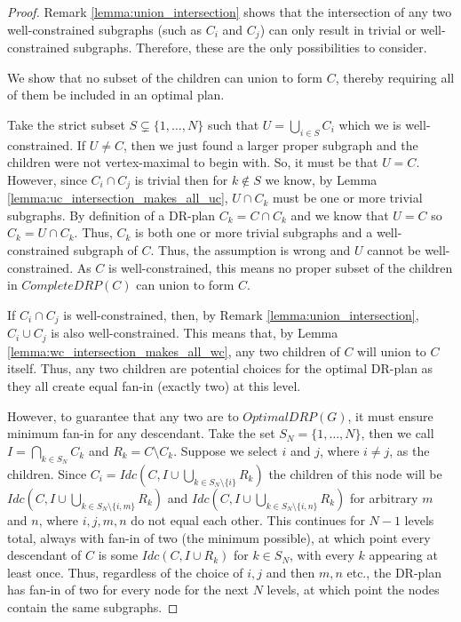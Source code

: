 \begin{proof}
Remark \ref{lemma:union_intersection} shows that the intersection of any two well-constrained subgraphs (such as $C_i$ and $C_j$) can only result in trivial or well-constrained subgraphs. Therefore, these are the only possibilities to consider.

\medskip\noindent
{} We show that no subset of the children can union to form $C$, thereby requiring all of them be included in an optimal plan.

Take the strict subset $S\subsetneq \{1,\ldots,N\}$ such that $U=\bigcup_{i\in S}{C_i}$ which we  is well-constrained. If $U\neq C$, then we just found a larger proper subgraph and the children were not vertex-maximal to begin with. So, it must be that $U=C$.
\usestwod
However, since $C_i \cap C_j$ is trivial then for $k\notin S$ we know, by Lemma \ref{lemma:uc_intersection_makes_all_uc}, $U\cap C_k$ must be one or more trivial subgraphs. By definition of a DR-plan $C_k=C\cap C_k$ and we know that $U=C$ so $C_k=U\cap C_k$. Thus, $C_k$ is both one or more trivial subgraphs and a well-constrained subgraph of $C$. Thus, the assumption is wrong and $U$ cannot be well-constrained. As $C$ is well-constrained, this means no proper subset of the children in $CompleteDRP(C)$ can union to form $C$.

\medskip\noindent
{} If $C_i \cap C_j$ is well-constrained, then, by Remark \ref{lemma:union_intersection}, $C_i \cup C_j$ is also well-constrained. This means that, by Lemma \ref{lemma:wc_intersection_makes_all_wc}, any two children of $C$ will union to $C$ itself. Thus, any two children are potential choices for the optimal DR-plan as they all create equal fan-in (exactly two) at this level.

However, to guarantee that any two are  to $OptimalDRP(G)$, it must ensure minimum fan-in for any descendant. Take the set $S_N=\{1,\dots,N\}$, then we call $I=\bigcap_{k\in S_N}{C_k}$ and $R_k=C\setminus C_k$. Suppose we select $i$ and $j$, where $i\neq j$, as the children. Since
$C_i=Idc\left(C,I\cup\bigcup_{k\in S_N\setminus\{i\}}{R_k}\right)$
the children of this node will be
$Idc\left(C,I\cup\bigcup_{k\in S_N\setminus\{i,m\}}{R_k}\right)$
and
$Idc\left(C,I\cup\bigcup_{k\in S_N\setminus\{i,n\}}{R_k}\right)$
for arbitrary $m$ and $n$, where $i,j,m,n$ do not equal each other.  This continues for $N-1$ levels total, always with fan-in of two (the minimum possible), at which point every descendant of $C$ is some $Idc(C,I\cup R_k)$ for $k\in S_N$, with every $k$ appearing at least once. Thus, regardless of the choice of $i,j$ and then $m,n$ etc., the DR-plan has fan-in of two for every node for the next $N$ levels, at which point the nodes contain the same subgraphs.


\end{proof}

